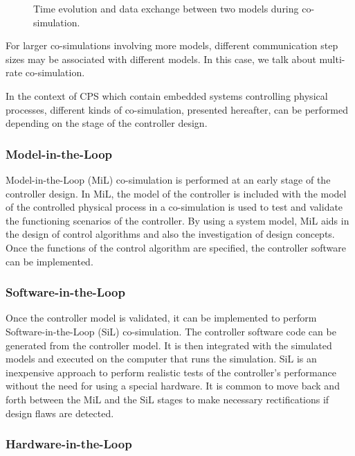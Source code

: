 \begin{figure}[phbt]
\centering

\caption{Time evolution and data exchange between two models during co-simulation.}
\label{fig:cosim}
\end{figure}

For larger co-simulations involving more models, different communication step sizes may be associated with different models. In this case, we talk about multi-rate co-simulation.

In the context of CPS which contain embedded systems controlling physical processes, different kinds of co-simulation, presented hereafter, can be performed depending on the stage of the controller design.

\subsubsection{Model-in-the-Loop}

Model-in-the-Loop (MiL) co-simulation is performed at an early stage of the controller design. In MiL, the model of the controller is included with the model of the controlled physical process in a co-simulation is used to test and validate the functioning scenarios of the controller. By using a system model, MiL aids in the design of control algorithms and also the investigation of design concepts. Once the functions of the control algorithm are specified, the controller software can be implemented.

\subsubsection{Software-in-the-Loop}

Once the controller model is validated, it can be implemented to perform Software-in-the-Loop (SiL) co-simulation. The controller software code can be generated from the controller model. It is then integrated with the simulated models and executed on the computer that runs the simulation. SiL is an inexpensive approach to perform realistic tests of the controller’s performance without the need for using a special hardware. It is common to move back and forth between the MiL and the SiL stages to make necessary rectifications if design flaws are detected.

\subsubsection{Hardware-in-the-Loop}

